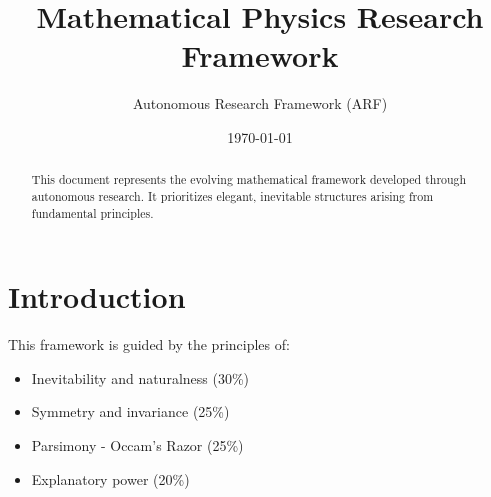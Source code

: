 \documentclass[12pt]{article}
\title{Mathematical Physics Research Framework}
\author{Autonomous Research Framework (ARF)}
\date{\today}
\begin{document}
\maketitle

\begin{abstract}
This document represents the evolving mathematical framework developed through autonomous research. 
It prioritizes elegant, inevitable structures arising from fundamental principles.
\end{abstract}

\section{Introduction}
This framework is guided by the principles of:
\begin{itemize}
    \item Inevitability and naturalness (30\%)
    \item Symmetry and invariance (25\%)
    \item Parsimony - Occam's Razor (25\%)
    \item Explanatory power (20\%)
\end{itemize}

\end{document}

